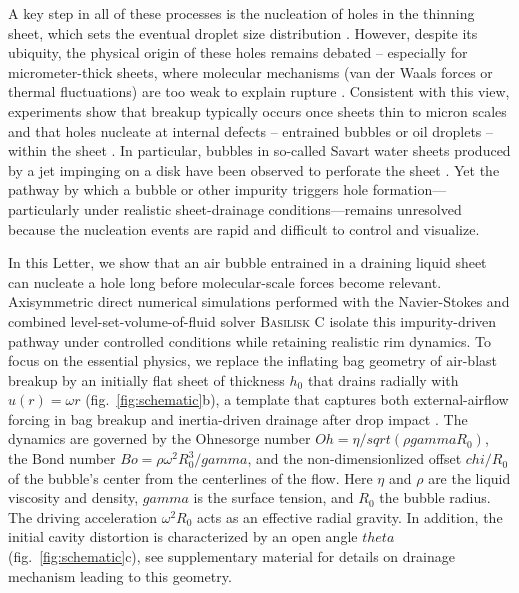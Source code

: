 \documentclass[reprint,amssymb,superscriptaddress,aps,prl,floatfix]{revtex4-2}
\def\chi{chi}%
\def\theta{theta}%
\def\gamma{gamma}%
\def\sqrt#1{sqrt(#1)}%
\begin{document}
A key step in all of these processes is the nucleation of holes in the thinning sheet,
which sets the eventual droplet size distribution \cite{dombrowski1954photographic,
taylor1959dynamics}. 
However, despite its ubiquity, the physical origin of these holes remains
debated \cite{lohse2020double} -- especially for micrometer-thick sheets, where molecular 
mechanisms (van der Waals forces or thermal fluctuations) are too weak to explain rupture
\cite{neel2018spontaneous}.  Consistent with this view, experiments show that breakup
typically occurs once sheets thin to micron scales and that holes nucleate at internal
defects -- entrained bubbles or oil droplets -- within the sheet \cite{opfer2014droplet,
kant2023bag, jackiw2021aerodynamic, stumpf2023drop, aljedaani2018experiments,
thoroddsen2006crown}. In particular, bubbles in so-called Savart water sheets produced by a jet
impinging on a disk have been observed to perforate the sheet
\cite{lhuissier2013effervescent, gong2022effect}. Yet the pathway by which a bubble or
other impurity triggers hole formation—particularly under realistic sheet-drainage
conditions—remains unresolved because the nucleation events are rapid and difficult to
control and visualize.

In this Letter, we show that an air bubble entrained in a draining liquid sheet can
nucleate a hole long before molecular-scale forces become relevant. Axisymmetric direct
numerical simulations performed with the Navier-Stokes and combined level-set-volume-of-fluid solver \textsc{Basilisk C}
\cite{basilliskpopinet, supplMaterial}\nocite{coderepository,tryggvason2011direct,
  brackbill1992continuum, sussman2000coupled, saini2025implementation,
popinet2015quadtree, popinet2009accurate, popinet2018numerical, duchemin2002jet,
deike2018dynamics, bouwhuis2012maximal} isolate this impurity-driven pathway under
controlled conditions while retaining realistic rim dynamics. To focus on the essential
physics, we replace the inflating bag geometry of air-blast breakup by an initially flat
sheet of thickness $h_0$ that drains radially with $u(r)=\omega r$
(fig.~\ref{fig:schematic}b), a template that captures both external-airflow forcing in bag
breakup \cite{jalaal2012fragmentation} and inertia-driven drainage after drop impact \cite{sanjay2025unifying}. The dynamics are governed by the
Ohnesorge number $Oh=\eta/\sqrt{\rho\gamma R_0}$, the Bond number $Bo=\rho\omega^2
R_0^3/\gamma$, and the non-dimensionlized offset $\chi/R_0$ of the bubble's center from the centerlines of the flow. Here $\eta$ and $\rho$ are the liquid
viscosity and density, $\gamma$ is the surface tension, and $R_0$ the bubble radius. The
driving acceleration $\omega^2 R_0$ acts as an effective radial gravity. In addition, the initial cavity distortion is characterized by an open angle $\theta$ (fig.~\ref{fig:schematic}c), see supplementary material \cite{supplMaterial}\nocite{coderepository,tryggvason2011direct,
	brackbill1992continuum, sussman2000coupled, saini2025implementation,
	popinet2015quadtree, popinet2009accurate, popinet2018numerical, duchemin2002jet,
	deike2018dynamics, bouwhuis2012maximal} for details on drainage mechanism leading to this geometry. 
\end{document}
